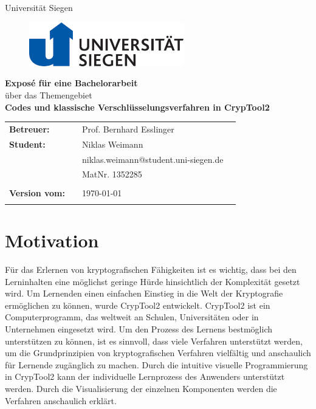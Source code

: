 \documentclass[fontsize=11pt, paper=a4, parskip=half]{scrartcl}
\begin{document}
\thispagestyle{empty}

\begin{center}
\Large{Universität Siegen}\\
\end{center}

\begin{figure}[t]
 \centering
 \includegraphics[width=0.6\textwidth]{images/uni-siegen.png}
\end{figure}

\vspace{2.5cm}
\begin{center}
\textbf{\LARGE{Exposé für eine Bachelorarbeit}}\\
\Large{über das Themengebiet}\\
\textbf{\LARGE{Codes und klassische Verschlüsselungsverfahren in CrypTool2}}\\
\end{center}
\vspace{6cm}
\begin{flushleft}
\begin{tabular}{llll}
\textbf{Betreuer:} & & Prof. Bernhard Esslinger  & \\
\textbf{Student:} & & Niklas Weimann & \\
& & niklas.weimann@student.uni-siegen.de & \\
& & MatNr. 1352285 & \\
& & \\
\textbf{Version vom:} & & \today &\\
& & \\
\end{tabular}
\end{flushleft}
\newpage

\tableofcontents
\newpage

\section{Motivation}
Für das Erlernen von kryptografischen Fähigkeiten ist es wichtig, dass bei den Lerninhalten eine möglichst geringe Hürde hinsichtlich der Komplexität gesetzt wird. Um Lernenden einen einfachen Einstieg in die Welt der Kryptografie ermöglichen zu können, wurde CrypTool2 entwickelt. CrypTool2 ist ein Computerprogramm, das weltweit an Schulen, Universitäten oder in Unternehmen eingesetzt wird. Um den Prozess des Lernens bestmöglich unterstützen zu können, ist es sinnvoll, dass viele Verfahren unterstützt werden, um die Grundprinzipien von kryptografischen Verfahren vielfältig und anschaulich für Lernende zugänglich zu machen. Durch die intuitive visuelle Programmierung in CrypTool2 kann der individuelle Lernprozess des Anwenders unterstützt werden. Durch die Visualisierung der einzelnen Komponenten werden die Verfahren anschaulich erklärt.
\end{document}
